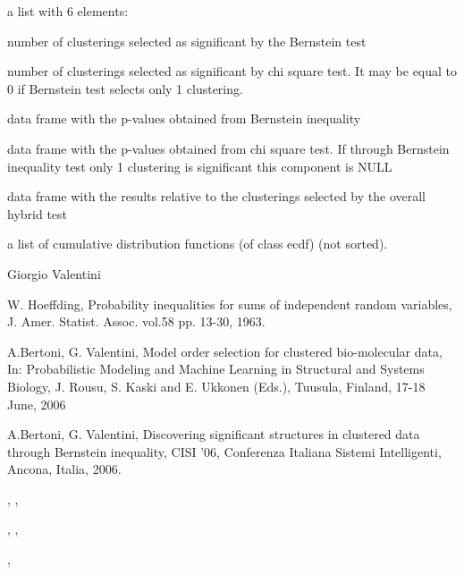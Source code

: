\documentclass{article}
\begin{document}
\begin{Value}
a list with 6 elements: 
\begin{ldescription}
\item[\code{n.Bernstein.selected }] number of clusterings selected as  significant by the Bernstein test
\item[\code{n.chi.sq.selected }] number of clusterings selected as  significant by chi square test. It may be 
equal to 0 if Bernstein test selects only 1 clustering.
\item[\code{Bernstein.res }] data frame with the p-values obtained from Bernstein inequality 
\item[\code{chi.sq.res }] data frame with the p-values obtained from chi square test. If through Bernstein 
inequality test only 1 clustering is significant this component is NULL
\item[\code{selected.res }] data frame with the results relative to the clusterings selected by the overall hybrid test 
\item[\code{F}] a list of cumulative distribution functions (of class ecdf) (not sorted).
\end{ldescription}
\end{Value}
\begin{Author}\relax
Giorgio Valentini 
\end{Author}
\begin{References}\relax
W. Hoeffding, Probability inequalities for sums of independent random variables, J. Amer. Statist. Assoc. vol.58 pp. 13-30, 1963.

A.Bertoni, G. Valentini, Model order selection for clustered bio-molecular data,  
In: Probabilistic Modeling and Machine Learning in Structural and Systems Biology, J. Rousu, S. Kaski and E. Ukkonen (Eds.), 
Tuusula, Finland, 17-18 June,  2006

A.Bertoni, G. Valentini, Discovering significant structures in clustered data through Bernstein inequality, 
CISI '06, Conferenza Italiana Sistemi Intelligenti, Ancona, Italia, 2006.
\end{References}
\begin{SeeAlso}\relax
{}, , 

, , 

, 
\end{SeeAlso}
\end{document}
